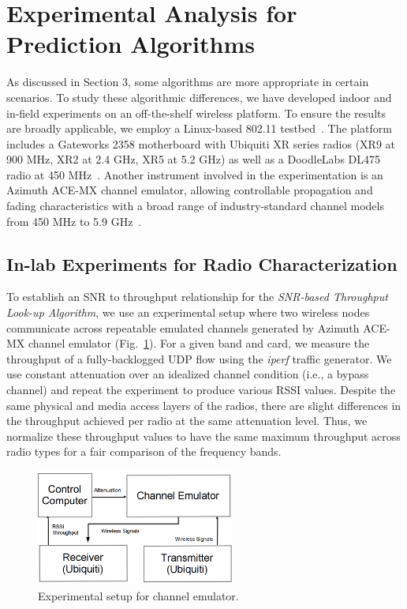 \section{Experimental Analysis for Prediction Algorithms}
\label{sec:experiment design}

As discussed in Section 3, some algorithms are more appropriate in certain 
scenarios. To study these algorithmic differences, we have developed indoor 
and in-field experiments on an off-the-shelf wireless platform.
To ensure the results are broadly applicable, we employ a Linux-based 
802.11 testbed~\cite{Openwrt}. The platform includes a Gateworks 2358 
motherboard with Ubiquiti XR series radios (XR9 at 900 MHz, XR2 at 2.4 GHz, 
XR5 at 5.2 GHz) as well as a DoodleLabs DL475 radio at 
450 MHz~\cite{Gateworks,Ubnt}.  Another instrument involved in the 
experimentation is an Azimuth ACE-MX channel emulator, allowing 
controllable propagation and fading characteristics with a broad range of 
industry-standard channel models from 450 MHz to 5.9 GHz~\cite{AzimuthACE}. 

\subsection{In-lab Experiments for Radio Characterization}
\label{subsec:ichannel}
To establish an SNR to throughput relationship for the \emph{SNR-based 
Throughput Look-up Algorithm}, we use an experimental setup where two 
wireless nodes communicate across repeatable emulated channels generated 
by Azimuth ACE-MX channel emulator (Fig.~\ref{fig:in-door experiment}). For a given band and card, we measure
the throughput of a fully-backlogged UDP flow using the {\it iperf} 
traffic generator. We use constant attenuation over an idealized
channel condition (i.e., a bypass channel) and repeat the experiment to
produce various RSSI values.
Despite the same physical and media access layers of the radios, there are
slight differences in the throughput achieved per radio at the same attenuation
level.  Thus, we normalize these throughput values to have the same maximum
throughput across radio types for a fair comparison of the frequency bands.

\begin{figure}
\vspace{-0.1in}
\centering
\includegraphics[width=65mm]{figure/emulator2}
\vspace{-0.1in}
\caption{Experimental setup for channel emulator.}
\label{fig:in-door experiment}
\end{figure}

